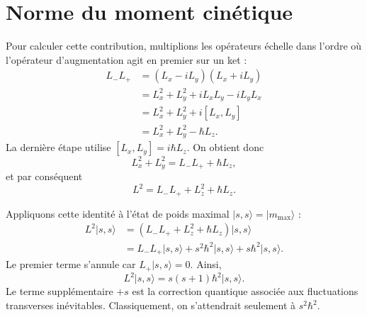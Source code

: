 \section{Norme du moment cinétique}

\begin{classroomqa}
\end{classroomqa}

Pour calculer cette contribution, multiplions les opérateurs échelle dans l’ordre où l’opérateur d’augmentation agit en premier sur un ket :
\begin{align}
L_-L_+
&=(L_x-iL_y)(L_x+iL_y) \\
&=L_x^2+L_y^2+iL_xL_y-iL_yL_x \\
&=L_x^2+L_y^2+i[L_x,L_y] \\
&=L_x^2+L_y^2-\hbar L_z.
\end{align}
La dernière étape utilise \([L_x,L_y]=i\hbar L_z\). On obtient donc
\begin{equation}
L_x^2+L_y^2=L_-L_++\hbar L_z,
\end{equation}
et par conséquent
\begin{equation}
L^2=L_-L_++L_z^2+\hbar L_z.
\end{equation}

Appliquons cette identité à l’état de poids maximal \(\lvert s,s\rangle=\lvert m_{\max}\rangle\) :
\begin{align}
L^2\lvert s,s\rangle
&=\left(L_-L_++L_z^2+\hbar L_z\right)\lvert s,s\rangle \\
&=L_-L_+\lvert s,s\rangle
+s^2\hbar^2\lvert s,s\rangle
+s\hbar^2\lvert s,s\rangle.
\end{align}
Le premier terme s’annule car \(L_+\lvert s,s\rangle=0\). Ainsi,
\begin{equation}
L^2\lvert s,s\rangle
=s(s+1)\hbar^2\lvert s,s\rangle.
\end{equation}
Le terme supplémentaire \(+s\) est la correction quantique associée aux fluctuations transverses inévitables. Classiquement, on s’attendrait seulement à \(s^2\hbar^2\).

